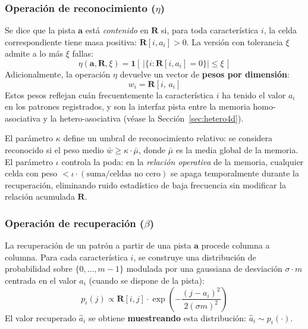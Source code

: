 \subsubsection*{Operación de reconocimiento ($\eta$)}

Se dice que la pista $\mathbf{a}$ está \emph{contenido} en $\mathbf{R}$ si, para toda
característica $i$, la celda correspondiente tiene masa positiva: $\mathbf{R}[i, a_i] > 0$.
La versión con tolerancia $\xi$ admite a lo más $\xi$ fallas:
\begin{equation}
    \eta(\mathbf{a}, \mathbf{R}, \xi) = \mathbf{1}\!\left[\,\bigl|\{i : \mathbf{R}[i, a_i] = 0\}\bigr| \leq \xi\,\right]
    \label{eq:reconocimiento}
\end{equation}
Adicionalmente, la operación $\eta$ devuelve un vector de \textbf{pesos por dimensión}:
\begin{equation}
    w_i = \mathbf{R}[i,\, a_i]
    \label{eq:pesos}
\end{equation}
Estos pesos reflejan cuán frecuentemente la característica $i$ ha tenido el valor $a_i$ en los
patrones registrados, y son la interfaz pista entre la memoria homo-asociativa y la
hetero-asociativa (véase la Sección~\ref{sec:hetero4d}).

El parámetro $\kappa$ define un umbral de reconocimiento relativo: se considera
reconocido si el peso medio $\bar{w} \geq \kappa \cdot \bar{\mu}$, donde $\bar{\mu}$ es
la media global de la memoria.
El parámetro $\iota$ controla la poda: en la \emph{relación operativa} de la memoria,
cualquier celda con peso $< \iota \cdot (\text{suma}/\text{celdas no cero})$ se
apaga temporalmente durante la recuperación, eliminando ruido estadístico de baja
frecuencia sin modificar la relación acumulada $\mathbf{R}$.

\subsubsection*{Operación de recuperación ($\beta$)}

La recuperación de un patrón a partir de una pista $\mathbf{a}$ procede columna a columna.
Para cada característica $i$, se construye una distribución de probabilidad sobre $\{0,\ldots,m-1\}$
modulada por una gaussiana de desviación $\sigma \cdot m$ centrada en el valor $a_i$
(cuando se dispone de la pista):
\begin{equation}
    p_i(j) \propto \mathbf{R}[i, j] \cdot \exp\!\left(-\frac{(j - a_i)^2}{2(\sigma m)^2}\right)
    \label{eq:distribucion-recuperacion}
\end{equation}
El valor recuperado $\hat{a}_i$ se obtiene \textbf{muestreando} esta distribución:
$\hat{a}_i \sim p_i(\cdot)$.

